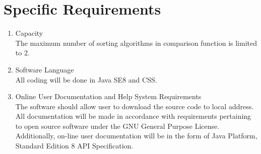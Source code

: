 \documentclass[12pt]{article}
\begin{document}
\section{Specific Requirements}

\begin{enumerate}
\item Capacity\\The maximum number of sorting algorithms in comparison function is limited to 2. 

\item Software Language\\ All coding will be done in Java SE8 and CSS.  

\item Online User Documentation and Help System Requirements\\The software should allow user to download the source code to local address. All documentation will be made in accordance with requirements pertaining to open source software under the GNU General Purpose License. Additionally, on-line user documentation will be in the form of Java Platform, Standard Edition 8 API Specification.

\end{enumerate}
\end{document}
